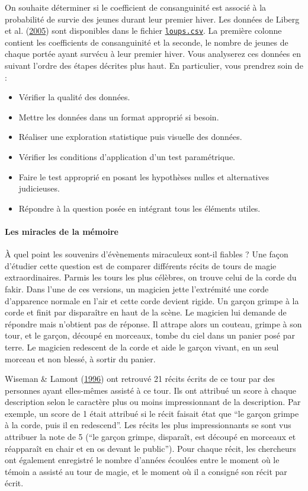\documentclass[
  a4paper,
]{article}
\providecommand{\tightlist}{%
  \setlength{\itemsep}{0pt}\setlength{\parskip}{0pt}}
\begin{document}
On souhaite déterminer si le coefficient de consanguinité est associé à la probabilité de survie des jeunes durant leur premier hiver. Les données de Liberg et al. (\protect\hyperlink{ref-liberg2005}{2005}) sont disponibles dans le fichier \href{https://besibo.github.io/Biometrie3/data/loups.csv}{\texttt{loups.csv}}. La première colonne contient les coefficients de consanguinité et la seconde, le nombre de jeunes de chaque portée ayant survécu à leur premier hiver. Vous analyserez ces données en suivant l'ordre des étapes décrites plus haut. En particulier, vous prendrez soin de :

\begin{itemize}
\tightlist
\item
  Vérifier la qualité des données.
\item
  Mettre les données dans un format approprié si besoin.
\item
  Réaliser une exploration statistique puis visuelle des données.
\item
  Vérifier les conditions d'application d'un test paramétrique.
\item
  Faire le test approprié en posant les hypothèses nulles et alternatives judicieuses.
\item
  Répondre à la question posée en intégrant tous les éléments utiles.
\end{itemize}

\hypertarget{les-miracles-de-la-muxe9moire}{%
\paragraph{Les miracles de la mémoire}\label{les-miracles-de-la-muxe9moire}}

À quel point les souvenirs d'évènements miraculeux sont-il fiables ? Une façon d'étudier cette question est de comparer différents récits de tours de magie extraordinaires. Parmis les tours les plus célèbres, on trouve celui de la corde du fakir. Dans l'une de ces versions, un magicien jette l'extrémité une corde d'apparence normale en l'air et cette corde devient rigide. Un garçon grimpe à la corde et finit par disparaître en haut de la scène. Le magicien lui demande de répondre mais n'obtient pas de réponse. Il attrape alors un couteau, grimpe à son tour, et le garçon, découpé en morceaux, tombe du ciel dans un panier posé par terre. Le magicien redescent de la corde et aide le garçon vivant, en un seul morceau et non blessé, à sortir du panier.

Wiseman \& Lamont (\protect\hyperlink{ref-wiseman1996}{1996}) ont retrouvé 21 récits écrits de ce tour par des personnes ayant elles-mêmes assisté à ce tour. Ils ont attribué un score à chaque description selon le caractère plus ou moins impressionnant de la description. Par exemple, un score de 1 était attribué si le récit faisait état que ``le garçon grimpe à la corde, puis il en redescend''. Les récits les plus impressionnants se sont vus attribuer la note de 5 (``le garçon grimpe, disparaît, est découpé en morceaux et réapparaît en chair et en os devant le public'').
Pour chaque récit, les chercheurs ont également enregistré le nombre d'années écoulées entre le moment où le témoin a assisté au tour de magie, et le moment où il a consigné son récit par écrit.
\end{document}
